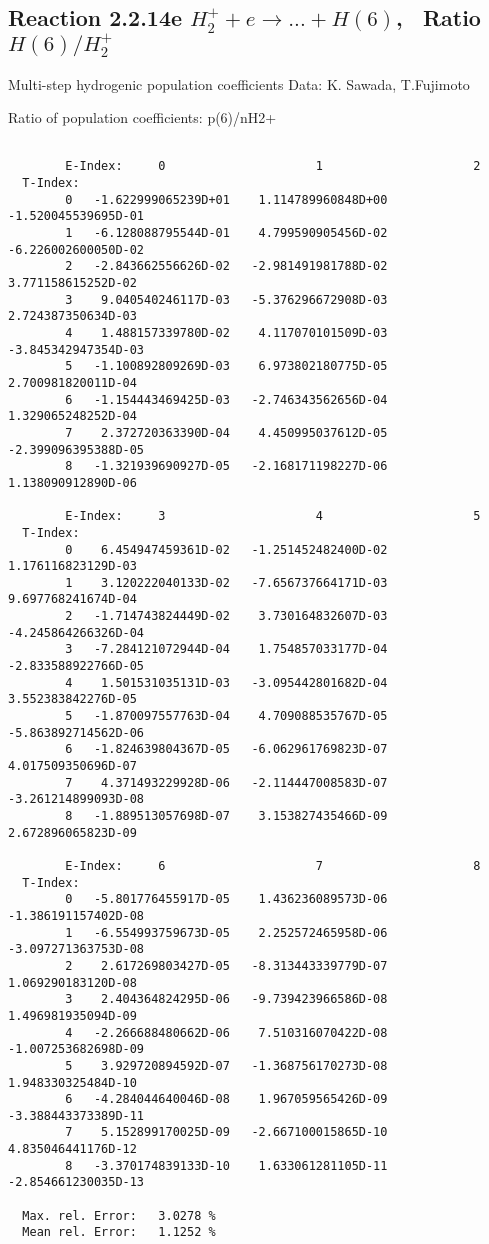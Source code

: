 \documentclass[12pt,dvipdfmx]{article}
\begin{document}
\subsection{
Reaction 2.2.14e $ H_2^+ + e \rightarrow ...+ H(6) $, \   Ratio $H(6)/H_2^+  $
}

 Multi-step hydrogenic population coefficients
 Data: K. Sawada, T.Fujimoto \cite{kn:Sawada}

 Ratio of population coefficients: p(6)/nH2+

\begin{small}\begin{verbatim}

        E-Index:     0                     1                     2
  T-Index:
        0   -1.622999065239D+01    1.114789960848D+00   -1.520045539695D-01
        1   -6.128088795544D-01    4.799590905456D-02   -6.226002600050D-02
        2   -2.843662556626D-02   -2.981491981788D-02    3.771158615252D-02
        3    9.040540246117D-03   -5.376296672908D-03    2.724387350634D-03
        4    1.488157339780D-02    4.117070101509D-03   -3.845342947354D-03
        5   -1.100892809269D-03    6.973802180775D-05    2.700981820011D-04
        6   -1.154443469425D-03   -2.746343562656D-04    1.329065248252D-04
        7    2.372720363390D-04    4.450995037612D-05   -2.399096395388D-05
        8   -1.321939690927D-05   -2.168171198227D-06    1.138090912890D-06

        E-Index:     3                     4                     5
  T-Index:
        0    6.454947459361D-02   -1.251452482400D-02    1.176116823129D-03
        1    3.120222040133D-02   -7.656737664171D-03    9.697768241674D-04
        2   -1.714743824449D-02    3.730164832607D-03   -4.245864266326D-04
        3   -7.284121072944D-04    1.754857033177D-04   -2.833588922766D-05
        4    1.501531035131D-03   -3.095442801682D-04    3.552383842276D-05
        5   -1.870097557763D-04    4.709088535767D-05   -5.863892714562D-06
        6   -1.824639804367D-05   -6.062961769823D-07    4.017509350696D-07
        7    4.371493229928D-06   -2.114447008583D-07   -3.261214899093D-08
        8   -1.889513057698D-07    3.153827435466D-09    2.672896065823D-09

        E-Index:     6                     7                     8
  T-Index:
        0   -5.801776455917D-05    1.436236089573D-06   -1.386191157402D-08
        1   -6.554993759673D-05    2.252572465958D-06   -3.097271363753D-08
        2    2.617269803427D-05   -8.313443339779D-07    1.069290183120D-08
        3    2.404364824295D-06   -9.739423966586D-08    1.496981935094D-09
        4   -2.266688480662D-06    7.510316070422D-08   -1.007253682698D-09
        5    3.929720894592D-07   -1.368756170273D-08    1.948330325484D-10
        6   -4.284044640046D-08    1.967059565426D-09   -3.388443373389D-11
        7    5.152899170025D-09   -2.667100015865D-10    4.835046441176D-12
        8   -3.370174839133D-10    1.633061281105D-11   -2.854661230035D-13

  Max. rel. Error:   3.0278 %
  Mean rel. Error:   1.1252 %

\end{verbatim}\end{small}
\end{document}
